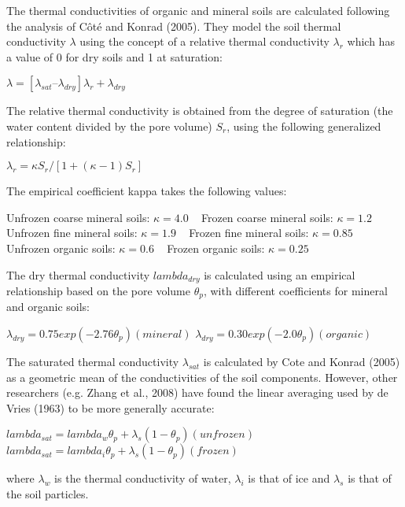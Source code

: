 The thermal conductivities of organic and mineral soils are calculated following the analysis of Côté and Konrad (2005). They model the soil thermal conductivity $\lambda$ using the concept of a relative thermal conductivity $\lambda_r$ which has a value of 0 for dry soils and 1 at saturation\+:

$\lambda = [ \lambda_{sat} – \lambda_{dry} ] \lambda_r + \lambda_{dry}$

The relative thermal conductivity is obtained from the degree of saturation (the water content divided by the pore volume) $S_r$, using the following generalized relationship\+:

$\lambda_r = \kappa S_r/[1 + (\kappa-1) S_r ]$

The empirical coefficient kappa takes the following values\+:

Unfrozen coarse mineral soils\+: $\kappa = 4.0$ ~\newline
Frozen coarse mineral soils\+: $\kappa = 1.2$ ~\newline
Unfrozen fine mineral soils\+: $\kappa = 1.9$ ~\newline
Frozen fine mineral soils\+: $\kappa = 0.85$ ~\newline
Unfrozen organic soils\+: $\kappa = 0.6$ ~\newline
Frozen organic soils\+: $\kappa = 0.25$

The dry thermal conductivity $lambda_{dry}$ is calculated using an empirical relationship based on the pore volume $\theta_p$, with different coefficients for mineral and organic soils\+:

$\lambda_{dry} = 0.75 exp(-2.76 \theta_p) (mineral)$ $\lambda_{dry} = 0.30 exp(-2.0 \theta_p) (organic)$

The saturated thermal conductivity $\lambda_{sat}$ is calculated by Cote and Konrad (2005) \cite{Cote2005-ew} as a geometric mean of the conductivities of the soil components. However, other researchers (e.\+g. Zhang et al., 2008) have found the linear averaging used by de Vries (1963) \cite{Vries1963-ti} to be more generally accurate\+:

$lambda_{sat} = lambda_w \theta_p + \lambda_s (1 - \theta_p) (unfrozen)$ $lambda_{sat} = lambda_i \theta_p + \lambda_s (1 - \theta_p) (frozen)$

where $\lambda_w$ is the thermal conductivity of water, $\lambda_i$ is that of ice and $\lambda_s$ is that of the soil particles.

